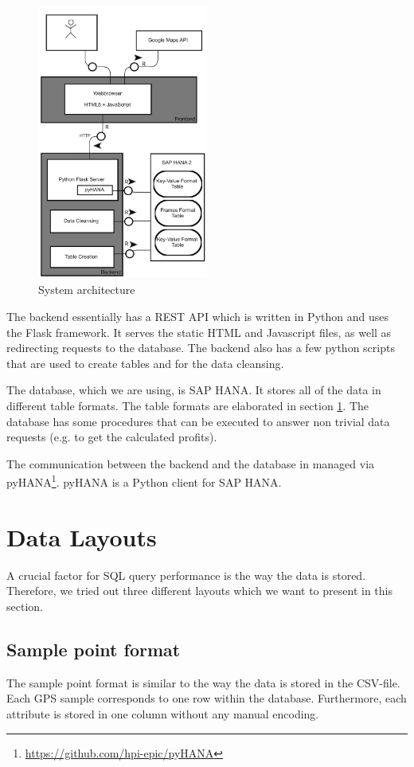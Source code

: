 \documentclass[10pt]{sig-alternate}
\begin{document}
\begin{figure}[ht]
\centering
\includegraphics[width=0.5\textwidth]{img/architecture.png}
\caption{System architecture}
\label{fig:architecture}
\end{figure}

The backend essentially has a REST API which is written in Python and uses the Flask framework. It serves the static HTML and Javascript files, as well as redirecting requests to the database. The backend also has a few python scripts that are used to create tables and for the data cleansing.

The database, which we are using, is SAP HANA. It stores all of the data in different table formats. The table formats are elaborated in section \ref{sec:data_layouts}. The database has some procedures that can be executed to answer non trivial data requests (e.g. to get the calculated profits).

The communication between the backend and the database in managed via pyHANA\footnote{\href{https://github.com/hpi-epic/pyHANA}{https://github.com/hpi-epic/pyHANA}}. pyHANA is a Python client for SAP HANA.


\section{Data Layouts}
\label{sec:data_layouts}
A crucial factor for SQL query performance is the way the data is stored. Therefore, we tried out three different layouts which we want to present in this section.
\subsection{Sample point format}
The sample point format is similar to the way the data is stored in the CSV-file. Each GPS sample corresponds to one row within the database. Furthermore, each attribute is stored in one column without any manual encoding.
\end{document}

